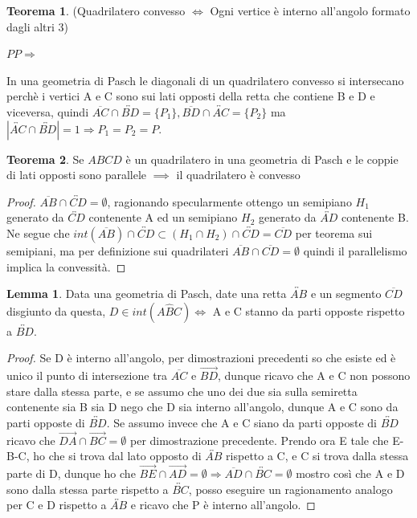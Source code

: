 \documentclass[a4paper,10pt]{article}
\theoremstyle{definition}
\theoremstyle{indentdefinition}
\theoremstyle{indentpostulate}
\theoremstyle{indenttheorem}
\newtheorem{thm}{Teorema}[section]
\newtheorem{lem*}{Lemma}[section]
\theoremstyle{myremark}
\theoremstyle{indentgeneral}
\begin{document}
\begin{thm}  (Quadrilatero convesso $\iff $ Ogni vertice è interno all'angolo formato dagli altri 3)    \end{thm} $PP \Rightarrow $ 

 In una geometria di Pasch le diagonali di un quadrilatero convesso si intersecano perchè i vertici A e C sono sui lati opposti della retta che contiene B e D e viceversa, quindi $\overline{AC} \cap \overleftrightarrow{BD}= \{ P_1 \} , \overline{BD} \cap \overleftrightarrow{AC}=\{ P_2 \}$ ma $|\overleftrightarrow{AC} \cap \overleftrightarrow{BD}|=1 \Rightarrow P_1=P_2=P$. 
 
 \begin{thm}  Se $ABCD$ è un quadrilatero in una geometria di Pasch e le coppie di lati opposti sono parallele $\implies$ il quadrilatero è convesso    \end{thm} 

 \begin{proof}   $\overline{AB} \cap \overleftrightarrow{CD} = \emptyset $, ragionando specularmente ottengo un semipiano $H_1$ generato da $\overleftrightarrow{CD}$ contenente A ed un semipiano $H_2$ generato da $\overleftrightarrow{AD}$ contenente B. Ne segue che $int(\overline{AB}) \cap \overleftrightarrow{CD} \subset (H_1 \cap H_2) \cap \overleftrightarrow{CD}=\overline{CD}$ per teorema sui semipiani, ma per definizione sui quadrilateri $\overline{AB} \cap \overline{CD}= \emptyset$ quindi il parallelismo implica la convessità.   \end{proof} 

 \begin{lem*}   Data una geometria di Pasch, date una retta $\overleftrightarrow{AB}$ e un segmento $\overline{CD}$ disgiunto da questa, $D \in int(A \hat{B} C) \iff$ A e C stanno da parti opposte rispetto a $\overleftrightarrow{BD}$.   \end{lem*} 

 \begin{proof} Se D è interno all'angolo, per dimostrazioni precedenti so che esiste ed è unico il punto di intersezione tra $\overline{AC}$ e $\overrightarrow{BD}$, dunque ricavo che A e C non possono stare dalla stessa parte, e se assumo che uno dei due sia sulla semiretta contenente sia B sia D nego che D sia interno all'angolo, dunque A e C sono da parti opposte di $\overleftrightarrow{BD}$. Se assumo invece che A e C siano da parti opposte di $\overleftrightarrow{BD}$ ricavo che $\overrightarrow{DA} \cap \overrightarrow{BC} = \emptyset$ per dimostrazione precedente. Prendo ora E tale che E-B-C, ho che si trova dal lato opposto di $\overleftrightarrow{AB}$ rispetto a C, e C si trova dalla stessa parte di D, dunque ho che $\overrightarrow{BE} \cap \overrightarrow{AD} = \emptyset \Rightarrow \overline{AD} \cap \overleftrightarrow{BC}= \emptyset$ mostro così che A e D sono dalla stessa parte rispetto a $\overleftrightarrow{BC}$, posso eseguire un ragionamento analogo per C e D rispetto a $\overleftrightarrow{AB}$ e ricavo che P è interno all'angolo.     \end{proof} 
\end{document}
